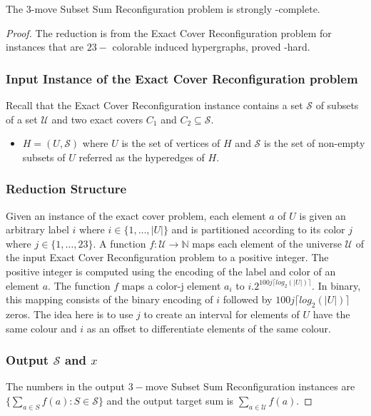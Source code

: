 \begin{example}{}
\end{example}



\begin{theorem}{The $3$-move Subset Sum Reconfiguration problem is strongly \PSPACE-complete.}\end{theorem}
\begin{proof}The reduction is from the Exact Cover Reconfiguration problem for instances that are $23-$ colorable induced hypergraphs, proved \PSPACE-hard.

\subsubsection{Input Instance of the Exact Cover Reconfiguration problem}
Recall that the Exact Cover Reconfiguration instance contains a set $\mathcal{S}$ of subsets of a set $\mathcal{U}$ and two exact
covers $C_1$ and $C_2 \subseteq \mathcal{S}$.
  
\begin{itemize}
  \item $H = (U, \mathcal{S})$ where $U$ is the set of vertices of $H$ and $\mathcal{S}$ is the set of non-empty subsets of $U$ referred
  as the hyperedges of $H$.
\end{itemize}


\subsubsection{Reduction Structure}
Given an instance of the exact cover problem, each element $a$ of $U$ is given an arbitrary label $i$ where $i \in \{1, \dots, |U|\}$ and
is partitioned according to its color $j$ where $j \in \{1, \dots, 23\}$.
A function $f : \mathcal{U} \rightarrow \mathbb{N}$ maps each element of the universe $\mathcal{U}$ of the input Exact Cover Reconfiguration
problem to a positive integer. The positive integer is computed using the encoding of the label and color of an element $a$. The function $f$ maps a color-j
element $a_{i}$ to $i.2^{100j \lceil log_{2}(|U|) \rceil}$. In binary, this mapping consists of the binary encoding of $i$ followed by $100j \lceil log_{2}(|U|) \rceil$
zeros. The idea here is to use $j$ to create an interval for elements of $U$ have the same colour and $i$ as an offset to differentiate elements of the same colour.


\subsubsection{Output $\mathcal{S}$ and $x$}
The numbers in the output $3-$move Subset Sum Reconfiguration instances are $\{\sum_{a \in S} f(a) : S \in \mathcal{S}\}$ and the
output target sum is $\sum_{a \in \mathcal{U}} f(a)$.



\end{proof}

